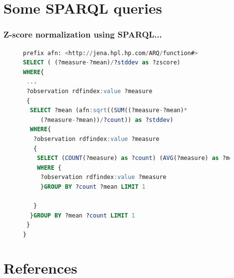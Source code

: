 \documentclass[xcolor=dvipsnames,dvip,notes=show,table]{beamer}
\begin{document}
\appendix
\section*{Some SPARQL queries}


\begin{frame}[fragile]
\frametitle{Z-score normalization using SPARQL...}

\scriptsize
\begin{figure}[!ht]
\begin{lstlisting}[language=SQL]  
prefix afn: <http://jena.hpl.hp.com/ARQ/function#>
SELECT ( (?measure-?mean)/?stddev as ?zscore) 
WHERE{
 ...
 ?observation rdfindex:value ?measure 
 {
  SELECT ?mean (afn:sqrt((SUM((?measure-?mean)*
	 (?measure-?mean))/?count)) as ?stddev) 
  WHERE{ 
   ?observation rdfindex:value ?measure 
   {
    SELECT (COUNT(?measure) as ?count) (AVG(?measure) as ?mean)
    WHERE {
     ?observation rdfindex:value ?measure 
     }GROUP BY ?count ?mean LIMIT 1

   }	
  }GROUP BY ?mean ?count LIMIT 1
 }
}
\end{lstlisting}
 \label{fig:sparql-zscore}
\end{figure}
\end{frame}


\section*{References}

\tiny




\normalsize

\frame{
\titlepage

}
\end{document}
